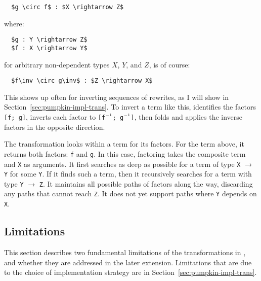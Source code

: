 \begin{lstlisting}
  $g \circ f$ : $X \rightarrow Z$
\end{lstlisting}
where:

\begin{lstlisting}
  $g : Y \rightarrow Z$
  $f : X \rightarrow Y$
\end{lstlisting}
for arbitrary non-dependent types $X$, $Y$, and $Z$,
is of course:

\begin{lstlisting}
  $f\inv \circ g\inv$ : $Z \rightarrow X$ 
\end{lstlisting}
This shows up often for inverting sequences of rewrites, as I will show in Section~\ref{sec:pumpkin-impl-trans}.
To invert a term like this, \sysname identifies the factors \lstinline{[f; g]}, 
inverts each factor to \lstinline{[f}$\inv$\lstinline{; g}$\inv$\lstinline{]}, 
then folds and applies the inverse factors in the opposite direction.

The  transformation looks within a term for its factors.
For the term above, it returns both factors: \lstinline{f} and \lstinline{g}.
In this case, factoring takes the composite term and \lstinline{X} as arguments.
It first searches as deep as possible for a term of type \lstinline{X} $\rightarrow$ \lstinline{Y} for some \lstinline{Y}.
If it finds such a term, then it recursively searches for a term with type \lstinline{Y} $\rightarrow$ \lstinline{Z}. 
It maintains all possible 
paths of factors along the way, discarding any paths that cannot reach \lstinline{Z}.
It does not yet support paths where \lstinline{Y} depends on \lstinline{X}.

\subsection{Limitations}
\label{sec:pumpkin-trans-limitations}

This section describes two fundamental limitations of the transformations in \sysname,
and whether they are addressed in the later \toolnamec extension.
Limitations that are due to the choice of implementation strategy are in Section~\ref{sec:pumpkin-impl-trans}.

